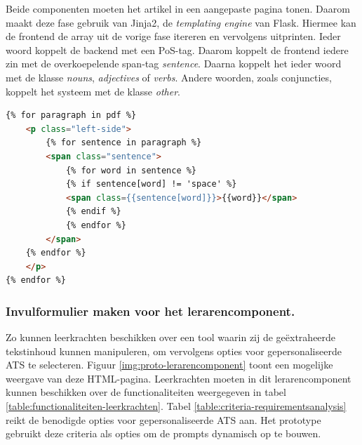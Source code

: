 Beide componenten moeten het artikel in een aangepaste pagina tonen. Daarom maakt deze fase gebruik van Jinja2, de \textit{templating engine} van Flask. Hiermee kan de frontend de array uit de vorige fase itereren en vervolgens uitprinten. Ieder woord koppelt de backend met een PoS-tag. Daarom koppelt de frontend iedere zin met de overkoepelende span-tag \textit{sentence}. Daarna koppelt het ieder woord met de klasse \textit{nouns}, \textit{adjectives} of \textit{verbs}. Andere woorden, zoals conjuncties, koppelt het systeem met de klasse \textit{other}.

\begin{lstlisting}[language=html, caption={Het doorlopen van de PDF-tekst op de webpagina en het toekennen van de span-tags.}, label={code:html-span-tags}]
{% for paragraph in pdf %}
	<p class="left-side">
		{% for sentence in paragraph %}
		<span class="sentence">
			{% for word in sentence %}
			{% if sentence[word] != 'space' %}
			<span class={{sentence[word]}}>{{word}}</span>
			{% endif %}
			{% endfor %}
		</span>
	{% endfor %}
	</p>
{% endfor %}
\end{lstlisting}


\subsubsection{Invulformulier maken voor het lerarencomponent.}

Zo kunnen leerkrachten beschikken over een tool waarin zij de geëxtraheerde tekstinhoud kunnen manipuleren, om vervolgens opties voor gepersonaliseerde ATS te selecteren. Figuur \ref{img:proto-lerarencomponent} toont een mogelijke weergave van deze HTML-pagina. Leerkrachten moeten in dit lerarencomponent kunnen beschikken over de functionaliteiten weergegeven in tabel \ref{table:functionaliteiten-leerkrachten}. Tabel \ref{table:criteria-requirementsanalysis} reikt de benodigde opties voor gepersonaliseerde ATS aan. Het prototype gebruikt deze criteria als opties om de prompts dynamisch op te bouwen.


